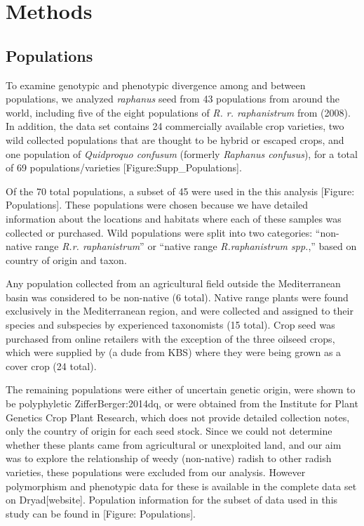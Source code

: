 \documentclass[twocolumn]{bmcart}%
\begin{document}
\section*{Methods}

\subsection*{Populations}

To examine genotypic and phenotypic divergence among and between populations, we analyzed \textit{raphanus} seed from 43 populations from around the world, including five of the eight populations of \textit{R. r. raphanistrum} from (2008). In addition, the data set contains 24 commercially available crop varieties, two wild collected populations that are thought to be hybrid or escaped crops, and one population of \textit{Quidproquo confusum} (formerly \textit{Raphanus confusus}), for a total of 69 populations/varieties [Figure:Supp\_Populations].

Of the 70 total populations, a subset of 45 were used in the this analysis [Figure: Populations]. These populations were chosen because we have detailed information about the locations and habitats where each of these samples was collected or purchased. Wild populations were split into two categories: “non-native range \textit{R.r. raphanistrum}” or “native range \textit{R.raphanistrum spp.},” based on country of origin and taxon.

Any population collected from an agricultural field outside the Mediterranean basin was considered to be non-native (6 total). Native range plants were found exclusively in the Mediterranean region, and were collected and assigned to their species and subspecies by experienced taxonomists (15 total). Crop seed was purchased from online retailers with the exception of the three oilseed crops, which were supplied by (a dude from KBS) where they were being grown as a cover crop (24 total).

The remaining populations were either of uncertain genetic origin, were shown to be polyphyletic {ZifferBerger:2014dq}, or were obtained from the Institute for Plant Genetics Crop Plant Research, which does not provide detailed collection notes, only the country of origin for each seed stock. Since we could not determine whether these plants came from agricultural or unexploited land, and our aim was to explore the relationship of weedy (non-native) radish to other radish varieties, these populations were excluded from our analysis. However polymorphism and phenotypic data for these is available in the complete data set on Dryad[website]. Population information for the subset of data used in this study can be found in [Figure: Populations].
\end{document}
